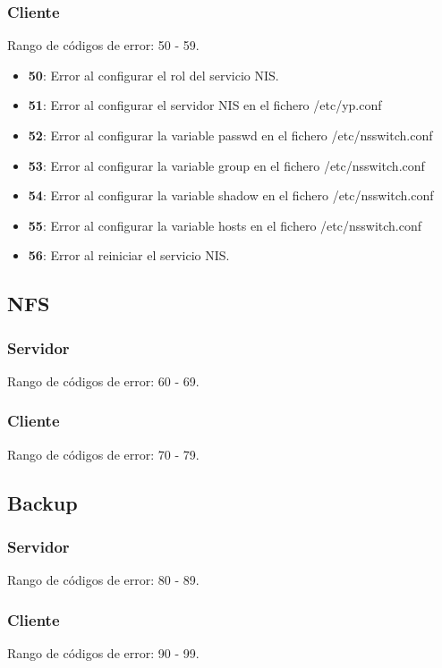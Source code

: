 \documentclass[12pt,a4paper, spanish]{article}
\begin{document}
\subsubsection{Cliente}
Rango de códigos de error: 50 - 59.
\begin{itemize}
  \item \textbf{50}: Error al configurar el rol del servicio NIS.
  \item \textbf{51}: Error al configurar el servidor NIS en el fichero /etc/yp.conf
  \item \textbf{52}: Error al configurar la variable passwd en el fichero /etc/nsswitch.conf
  \item \textbf{53}: Error al configurar la variable group en el fichero /etc/nsswitch.conf
  \item \textbf{54}: Error al configurar la variable shadow en el fichero /etc/nsswitch.conf
  \item \textbf{55}: Error al configurar la variable hosts en el fichero /etc/nsswitch.conf
  \item \textbf{56}: Error al reiniciar el servicio NIS.
\end{itemize}

\subsection{NFS}

\subsubsection{Servidor}
Rango de códigos de error: 60 - 69.

\subsubsection{Cliente}
Rango de códigos de error: 70 - 79.

\subsection{Backup}

\subsubsection{Servidor}
Rango de códigos de error: 80 - 89.

\subsubsection{Cliente}
Rango de códigos de error: 90 - 99.
\end{document}
